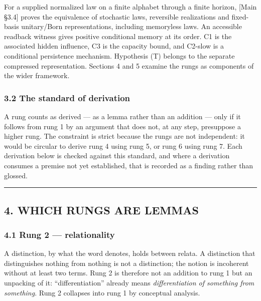 \documentclass[
]{article}
\begin{document}
For a supplied normalized law on a finite alphabet through a finite
horizon, {[}Main §3.4{]} proves the equivalence of stochastic laws,
reversible realizations and fixed-basis unitary/Born representations,
including memoryless laws. An accessible readback witness gives positive
conditional memory at its order. C1 is the associated hidden influence,
C3 is the capacity bound, and C2-slow is a conditional persistence
mechanism. Hypothesis (T) belongs to the separate compressed
representation. Sections 4 and 5 examine the rungs as components of the
wider framework.

\hypertarget{the-standard-of-derivation}{%
\subsubsection{3.2 The standard of
derivation}\label{the-standard-of-derivation}}

A rung counts as derived --- as a lemma rather than an addition --- only
if it follows from rung 1 by an argument that does not, at any step,
presuppose a higher rung. The constraint is strict because the rungs are
not independent: it would be circular to derive rung 4 using rung 5, or
rung 6 using rung 7. Each derivation below is checked against this
standard, and where a derivation consumes a premise not yet established,
that is recorded as a finding rather than glossed.

\begin{center}\rule{0.5\linewidth}{0.5pt}\end{center}

\hypertarget{which-rungs-are-lemmas}{%
\subsection{4. WHICH RUNGS ARE LEMMAS}\label{which-rungs-are-lemmas}}

\hypertarget{rung-2-relationality}{%
\subsubsection{4.1 Rung 2 ---
relationality}\label{rung-2-relationality}}

A distinction, by what the word denotes, holds between relata. A
distinction that distinguishes nothing from nothing is not a
distinction; the notion is incoherent without at least two terms. Rung 2
is therefore not an addition to rung 1 but an unpacking of it:
``differentiation'' already means \emph{differentiation of something
from something}. Rung 2 collapses into rung 1 by conceptual analysis.
\end{document}
